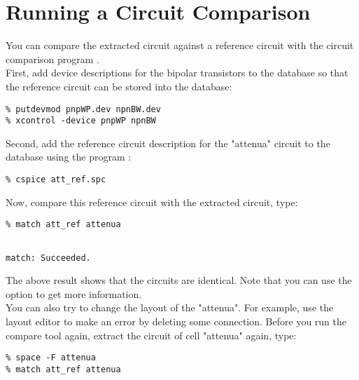 \section{Running a Circuit Comparison}
You can compare the extracted circuit against a reference circuit
with the circuit comparison program .
\\[1 ex]
First, add device descriptions for the bipolar transistors to the
database so that the reference circuit can be stored into the database:
\small
\begin{Verbatim}
% putdevmod pnpWP.dev npnBW.dev
% xcontrol -device pnpWP npnBW
\end{Verbatim}
\normalsize
Second, add the reference circuit description for the "attenua" circuit
to the database using the program :
\small
\begin{Verbatim}
% cspice att_ref.spc
\end{Verbatim}
\normalsize
Now, compare this reference circuit with the extracted circuit, type:
\small
\begin{Verbatim}
% match att_ref attenua
\end{Verbatim}
\normalsize
\small \begin{Verbatim}[frame=single]

match: Succeeded.

\end{Verbatim}
\normalsize
The above result shows that the circuits are identical.
Note that you can use the  option to get more information.
\\[1 ex]
You can also try to change the layout of the "attenua".
For example, use the layout editor  to make an error by deleting some connection.
Before you run the compare tool  again,
extract the circuit of cell "attenua" again, type:
\small
\begin{Verbatim}
% space -F attenua
% match att_ref attenua
\end{Verbatim}
\normalsize
